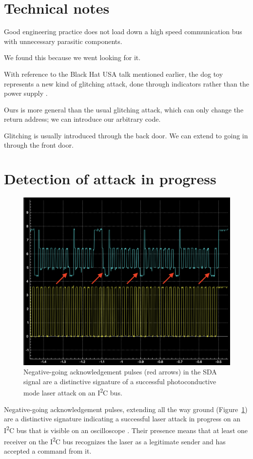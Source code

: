 \documentclass[letterpaper]{article}
\newcommand{\squared}{\textsuperscript{2}}
\begin{document}
\section{Technical notes}
Good engineering practice does not load down a high speed communication bus
with unnecessary parasitic components.

We found this because we went looking for it.

With reference to the Black Hat USA talk mentioned earlier, the dog toy
represents a new kind of glitching attack, done through indicators rather than
the power supply \cite{Beaumont2024a}.

Ours is more general than the usual glitching attack, which can only change the
return address; we can introduce our arbitrary code.

Glitching is usually introduced through the back door. We can extend to going
in through the front door.
\section{Detection of attack in progress}
\begin{figure}[ht]
  \centering
  \includegraphics[width=\linewidth]{graphics/signature_of_the_attack.png}
  \caption{Negative-going acknowledgement pulses (red arrows) in the SDA signal
    are a distinctive signature of a successful photoconductive mode laser
    attack on an I\squared C bus.}
  \label{figure:attack_signature}
\end{figure}
Negative-going acknowledgement pulses, extending all the way ground
(Figure~\ref{figure:attack_signature}) are a distinctive signature indicating a
successful laser attack in progress on an I\squared C bus that is visible on an
oscilloscope \cite{Loughry2024c}. Their presence means that at least one
receiver on the I\squared C bus recognizes the laser as a legitimate sender and
has accepted a command from it.
\end{document}
